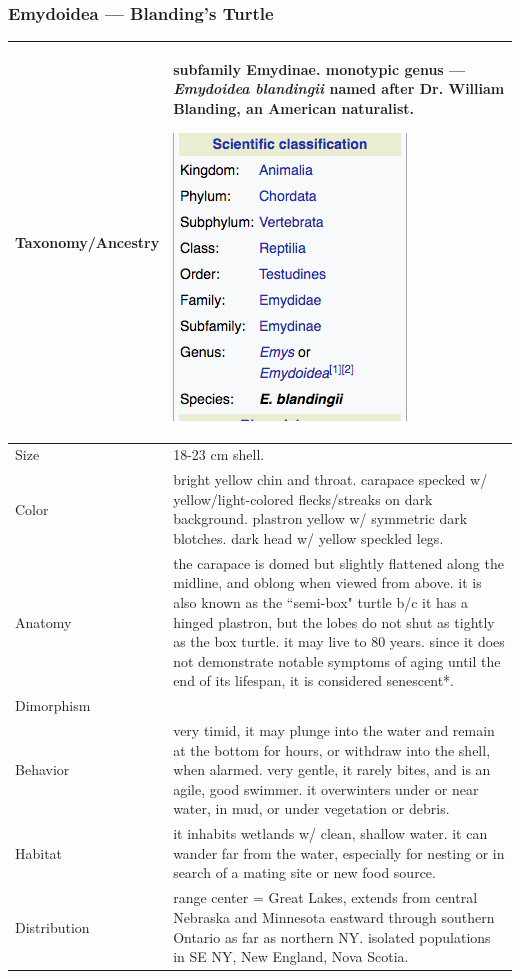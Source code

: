 \subsubsection{Emydoidea --- Blanding's Turtle}
\begin{center}
\begin{longtabu} to 

	\hline
	Taxonomy/Ancestry &
	subfamily Emydinae. monotypic genus --- \emph{Emydoidea blandingii} named after Dr. William Blanding, an American naturalist.
	
	\begin{center} \includegraphics[scale=0.5]{testudines/emydidae/emydoidea/tax} \end{center}
	 \\
	\hline
	Size & 
	18-23 cm shell.
	\\
	\hline
	Color &
	bright yellow chin and throat. carapace specked w/ yellow/light-colored flecks/streaks on dark background. plastron yellow w/ symmetric dark blotches. dark head w/ yellow speckled legs. 
	 \\
	\hline
	Anatomy &
	the carapace is domed but slightly flattened along the midline, and oblong when viewed from above. it is also known as the ``semi-box" turtle b/c it has a hinged plastron, but the lobes do not shut as tightly as the box turtle. it may live to 80 years. since it does not demonstrate notable symptoms of aging until the end of its lifespan, it is considered senescent*.
	 \\
	\hline
	Dimorphism & 
	
	\\
	\hline
	Behavior & 
	very timid, it may plunge into the water and remain at the bottom for hours, or withdraw into the shell, when alarmed. very gentle, it rarely bites, and is an agile, good swimmer. it overwinters under or near water, in mud, or under vegetation or debris.
	\\
	\hline
	Habitat & 
	it inhabits wetlands w/ clean, shallow water. it can wander far from the water, especially for nesting or in search of a mating site or new food source.
	\\
	\hline
	Distribution & 
	range center = Great Lakes, extends from central Nebraska and Minnesota eastward through southern Ontario as far as northern NY. isolated populations in SE NY, New England, Nova Scotia.
	

\end{longtabu}
\end{center}
